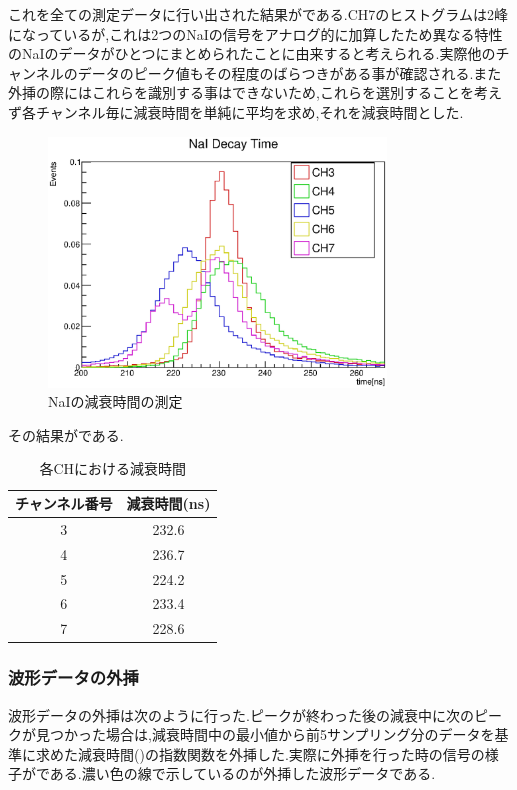 これを全ての測定データに行い出された結果がである.CH7のヒストグラムは2峰になっているが,これは2つのNaIの信号をアナログ的に加算したため異なる特性のNaIのデータがひとつにまとめられたことに由来すると考えられる.実際他のチャンネルのデータのピーク値もその程度のばらつきがある事が確認される.また外挿の際にはこれらを識別する事はできないため,これらを選別することを考えず各チャンネル毎に減衰時間を単純に平均を求め,それを減衰時間とした.
\begin{figure}[bht]
  \centering
  \includegraphics[width=0.8\textwidth]{figure/hatano/decaytime.eps}
  \caption{NaIの減衰時間の測定}
  \label{hatano_fig:decaytime}
\end{figure}

その結果がである.

\begin{table}[bht]
  \centering
  \caption{各CHにおける減衰時間}
  \begin{tabular}{cc}\\ \hline
    チャンネル番号 & 減衰時間(ns) \\ \hline
    3 & 232.6 \\
    4 & 236.7 \\
    5 & 224.2 \\
    6 & 233.4 \\
    7 & 228.6 \\ \hline
  \end{tabular}
  \label{hatano_tab:decaytime}
\end{table}

\subsubsection{波形データの外挿}
波形データの外挿は次のように行った.ピークが終わった後の減衰中に次のピークが見つかった場合は,減衰時間中の最小値から前5サンプリング分のデータを基準に求めた減衰時間()の指数関数を外挿した.実際に外挿を行った時の信号の様子がである.濃い色の線で示しているのが外挿した波形データである.

